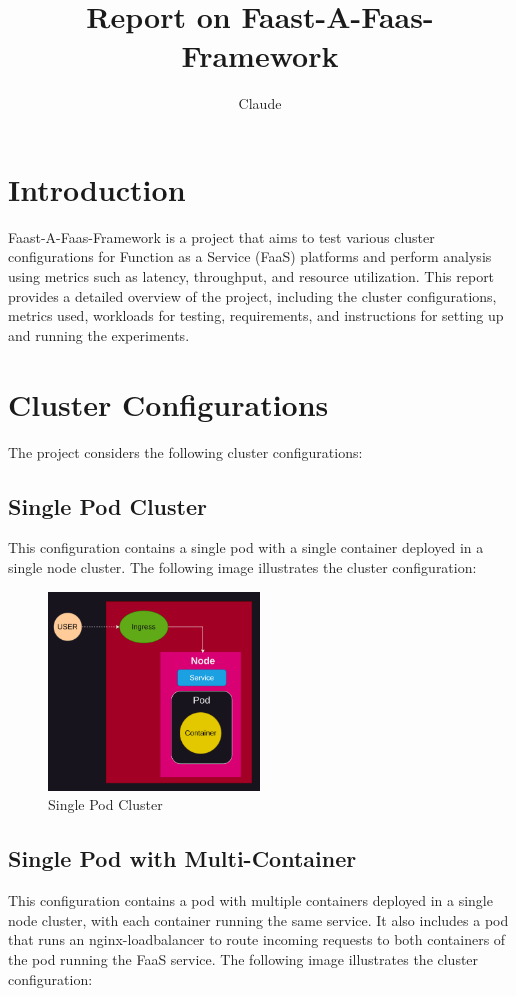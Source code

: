 \documentclass{article}
\title{Report on Faast-A-Faas-Framework}
\author{Claude}
\date{}
\begin{document}
\maketitle

\section{Introduction}
Faast-A-Faas-Framework is a project that aims to test various cluster configurations for Function as a Service (FaaS) platforms and perform analysis using metrics such as latency, throughput, and resource utilization. This report provides a detailed overview of the project, including the cluster configurations, metrics used, workloads for testing, requirements, and instructions for setting up and running the experiments.

\section{Cluster Configurations}
The project considers the following cluster configurations:

\subsection{Single Pod Cluster}
This configuration contains a single pod with a single container deployed in a single node cluster. The following image illustrates the cluster configuration:

\begin{figure}[H]
   \centering
   \includegraphics[width=0.5\textwidth]{../images/single_pod.png}
   \caption{Single Pod Cluster}
\end{figure}

\subsection{Single Pod with Multi-Container}
This configuration contains a pod with multiple containers deployed in a single node cluster, with each container running the same service. It also includes a pod that runs an nginx-loadbalancer to route incoming requests to both containers of the pod running the FaaS service. The following image illustrates the cluster configuration:
\end{document}
